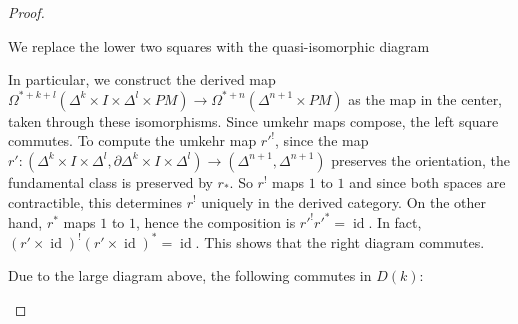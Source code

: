 \documentclass{scrartcl}
\theoremstyle{plain}
\theoremstyle{definition}
\DeclareMathOperator{\id}{id}
\newcommand{\comp}{\mathbin{\circ}}
\begin{document}
\begin{proof}
\begin{enumerate}
    We replace the lower two squares with the quasi-isomorphic diagram
    \begin{center}
    \end{center}
    In particular, we construct the derived map $\Omega^{*+k+l}(\Delta^k\times I\times \Delta^l\times PM)\to \Omega^{*+n}(\Delta^{n+1}\times PM)$ as the map in the center, taken through these isomorphisms. Since umkehr maps compose, the left square commutes. To compute the umkehr map $r'^!$, since the map $r'\colon (\Delta^k\times I\times \Delta^l, \partial \Delta^k\times I\times \Delta^l)\to (\Delta^{n+1}, \Delta^{n+1})$ preserves the orientation, the fundamental class is preserved by $r_*$. So $r^!$ maps $1$ to $1$ and since both spaces are contractible, this determines $r^!$ uniquely in the derived category. On the other hand, $r^*$ maps $1$ to $1$, hence the composition is $r'^! r'^* = \id$. In fact, $(r'\times \id)^!(r'\times\id)^* = \id$. This shows that the right diagram commutes. 

    Due to the large diagram above, the following commutes in $D(k)$: 


\end{enumerate}
\end{proof}
\end{document}
